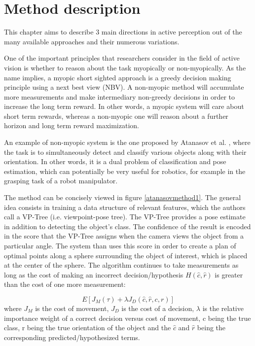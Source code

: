 \documentclass[12pt,twoside]{article}
\theoremstyle{plain}
\theoremstyle{definition}
\theoremstyle{remark}
\begin{document}
\section{Method description}
This chapter aims to describe 3 main directions in active perception out of the many available approaches and their numerous variations. 

One of the important principles that researchers consider in the field of active vision is whether to reason about the task myopically or non-myopically. As the name implies, a myopic short sighted approach is a greedy decision making principle using a next best view (NBV). A non-myopic method will accumulate more measurements and make intermediary non-greedy decisions in order to increase the long term reward. In other words, a myopic system will care about short term rewards, whereas a non-myopic one will reason about a further horizon and long term reward maximization.  

An example of non-myopic system is the one proposed by Atanasov et al. \cite{atanasov2014nonmyopic}, where the task is to simultaneously detect and classify various objects along with their orientation. In other words, it is a dual problem of classification and pose estimation, which can potentially be very useful for robotics, for example in the grasping task of a robot manipulator. 

The method can be concisely viewed in figure \ref{atanasovmethod1}. The general idea consists in training a data structure of relevant features, which the authors call a VP-Tree (i.e. viewpoint-pose tree). The VP-Tree provides a pose estimate in addition to detecting the object's class. The confidence of the result is encoded in the score that the VP-Tree assigns when the camera views the object from a particular angle. The system than uses this score in order to create a plan of optimal points along a sphere surrounding the object of interest, which is placed at the center of the sphere. The algorithm continues to take measurements as long as the cost of making an incorrect decision/hypothesis $H(\hat{c}, \hat{r})$ is greater than the cost of one more measurement:

$$ E[J_M(\tau) + \lambda J_D(\hat{c},\hat{r},c,r)] $$
where $J_M$ is the cost of movement, $J_D$ is the cost of a decision, $\lambda$ is the relative importance weight of a correct decision versus cost of movement, c being the true class, r being the true orientation of the object and the $\hat{c}$ and $\hat{r}$ being the corresponding predicted/hypothesized terms.
\end{document}
